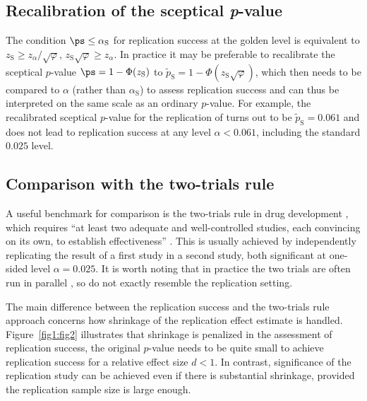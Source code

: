 \subsection{Recalibration of the sceptical \textit{p}-value}\label{sec1:recalib}

\sloppy The condition $\ps \leq \alpha_{\mathrm{S}}$ for replication success at the
golden level is equivalent to
\mbox{$z_{\mathrm{S}} \geq z_\alpha / \sqrt{\varphi}$}, \ie{}
$z_{\mathrm{S}} \sqrt{\varphi} \geq z_\alpha$. In practice it may be preferable
to recalibrate the sceptical $p$-value \mbox{$\ps = 1 - \Phi(z_{\mathrm{S}})$}
to $ \tilde{p}_{\mathrm{S}} = 1 - \Phi(z_{\mathrm{S}} \sqrt{\varphi})$, which
then needs to be compared to $\alpha$ (rather than $\alpha_{\mathrm{S}}$) to
assess replication success and can thus be interpreted on the same scale as an
ordinary $p$-value. For example, the recalibrated sceptical $p$-value for the
replication of \citet{Pyc2010} turns out to be $\tilde{p}_{\mathrm{S}}=0.061$
and does not lead to replication success at any level $\alpha<0.061$, including
the standard $0.025$ level.


\subsection{Comparison with the two-trials rule}\label{sec1:2TR}
A useful benchmark for comparison is the two-trials rule in drug development
\citep[Section 9.4]{Kay2015}, which requires ``at least two adequate and
well-controlled studies, each convincing on its own, to establish
effectiveness'' \citep[p.~3]{FDA1998}. This is usually achieved by independently
replicating the result of a first study in a second study, both significant at
one-sided level $\alpha=0.025$. {It is worth noting that in practice the two
  trials are often run in parallel} {\citep{Senn2008}}{, so do not exactly
  resemble the replication setting.}



The main difference between the replication success and the two-trials rule
approach concerns how shrinkage of the replication effect estimate is handled.
Figure~\ref{fig1:fig2} illustrates that shrinkage is penalized in the assessment
of replication success, \ie{} the original $p$-value needs to be quite small to
achieve replication success for a relative effect size $d<1$. In contrast,
significance of the replication study can be achieved even if there is
substantial shrinkage, provided the replication sample size is large enough.


